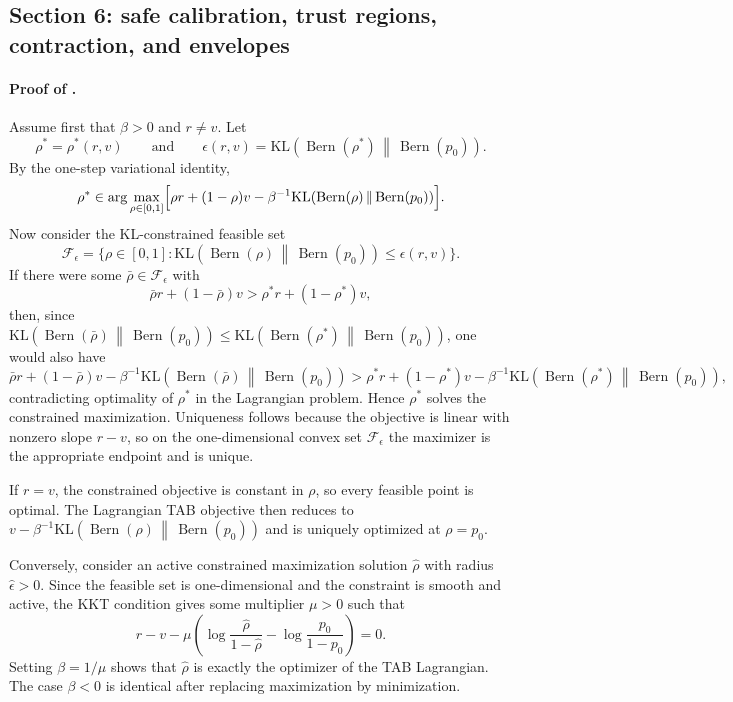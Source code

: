 \documentclass{article}
\theoremstyle{remark}
\DeclareMathOperator{\Bern}{Bern}
\newcommand{\KL}{\mathrm{KL}}
\newcommand{\pprior}{p_0}
\newcommand{\KLbin}[2]{\KL\!\left(\Bern(#1)\,\middle\|\,\Bern(#2)\right)}
\begin{document}
\subsection{Section 6: safe calibration, trust regions, contraction, and envelopes}
\label{app:safe}

\paragraph{Proof of .}
Assume first that $\beta>0$ and $r\neq v$. Let
\[
\rho^*=\rho^*(r,v)
\qquad\text{and}\qquad
\epsilon(r,v)=\KLbin{\rho^*}{\pprior}.
\]
By the one-step variational identity,
\[
\rho^*\in\arg\max_{\rho\in[0,1]}
\Bigl[\rho r+(1-\rho)v-\beta^{-1}\KLbin{\rho}{\pprior}\Bigr].
\]
Now consider the KL-constrained feasible set
\[
\mathcal F_\epsilon=\{\rho\in[0,1]: \KLbin{\rho}{\pprior}\le \epsilon(r,v)\}.
\]
If there were some $\bar\rho\in\mathcal F_\epsilon$ with
\[
\bar\rho r +(1-\bar\rho)v > \rho^* r +(1-\rho^*)v,
\]
then, since $\KLbin{\bar\rho}{\pprior}\le \KLbin{\rho^*}{\pprior}$, one would also have
\[
\bar\rho r +(1-\bar\rho)v - \beta^{-1}\KLbin{\bar\rho}{\pprior}
>
\rho^* r +(1-\rho^*)v - \beta^{-1}\KLbin{\rho^*}{\pprior},
\]
contradicting optimality of $\rho^*$ in the Lagrangian problem. Hence $\rho^*$ solves the constrained maximization. Uniqueness follows because the objective is linear with nonzero slope $r-v$, so on the one-dimensional convex set $\mathcal F_\epsilon$ the maximizer is the appropriate endpoint and is unique.

If $r=v$, the constrained objective is constant in $\rho$, so every feasible point is optimal. The Lagrangian TAB objective then reduces to $v-\beta^{-1}\KLbin{\rho}{\pprior}$ and is uniquely optimized at $\rho=\pprior$.

Conversely, consider an active constrained maximization solution $\hat\rho$ with radius $\hat\epsilon>0$. Since the feasible set is one-dimensional and the constraint is smooth and active, the KKT condition gives some multiplier $\mu>0$ such that
\[
r-v-\mu\left(\log\frac{\hat\rho}{1-\hat\rho}-\log\frac{\pprior}{1-\pprior}\right)=0.
\]
Setting $\beta=1/\mu$ shows that $\hat\rho$ is exactly the optimizer of the TAB Lagrangian. The case $\beta<0$ is identical after replacing maximization by minimization.
\end{document}
